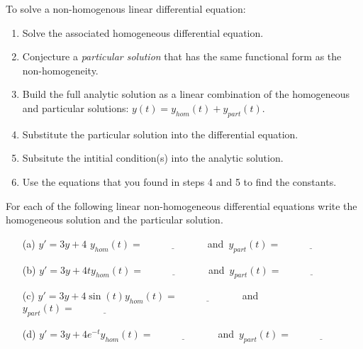 \begin{technique}
    To solve a non-homogenous linear differential equation:
    \begin{enumerate}
        \item Solve the associated homogeneous differential equation.
        \item Conjecture a {\it particular solution} that has the same functional form as
            the non-homogeneity.
        \item Build the full analytic solution as a linear combination of the homogeneous and
            particular solutions: $y(t) = y_{hom}(t) + y_{part}(t)$.
        \item Substitute the particular solution into the differential equation.
        \item Subsitute the intitial condition(s) into the analytic solution.
        \item Use the equations that you found in steps 4 and 5 to find the constants.
    \end{enumerate}
\end{technique}

\begin{problem}\label{prob:undet_coeff}
    For each of the following linear non-homogeneous differential equations write the homogeneous solution and the particular solution. 
    \begin{enumerate}
        \item[(a)] $y' = 3y + 4$ \qquad $y_{hom}(t) = \underline{\hspace{1in}}$\, and\, $y_{part}(t) = \underline{\hspace{1in}}$
        \item[(b)] $y' = 3y + 4t$\qquad $y_{hom}(t) = \underline{\hspace{1in}}$\, and\, $y_{part}(t) = \underline{\hspace{1in}}$
        \item[(c)] $y' = 3y + 4\sin(t)$\qquad $y_{hom}(t) = \underline{\hspace{1in}}$\,
            and\, $y_{part}(t) = \underline{\hspace{1in}}$
        \item[(d)] $y' = 3y + 4e^{-t}$\qquad $y_{hom}(t) = \underline{\hspace{1in}}$\,
            and\, $y_{part}(t) = \underline{\hspace{1in}}$
    \end{enumerate}
\end{problem}


